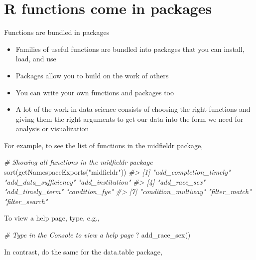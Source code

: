 \documentclass[
]{book}
\newenvironment{Shaded}{\begin{snugshade}}{\end{snugshade}}
\newcommand{\CommentTok}[1]{\textcolor[rgb]{0.56,0.35,0.01}{\textit{#1}}}
\newcommand{\FunctionTok}[1]{\textcolor[rgb]{0.00,0.00,0.00}{#1}}
\newcommand{\NormalTok}[1]{#1}
\newcommand{\StringTok}[1]{\textcolor[rgb]{0.31,0.60,0.02}{#1}}
\providecommand{\tightlist}{%
  \setlength{\itemsep}{0pt}\setlength{\parskip}{0pt}}
\begin{document}
\hypertarget{r-functions-come-in-packages}{%
\section{R functions come in packages}\label{r-functions-come-in-packages}}

Functions are bundled in packages

\begin{itemize}
\tightlist
\item
  Families of useful functions are bundled into packages that you can install, load, and use
\item
  Packages allow you to build on the work of others
\item
  You can write your own functions and packages too
\item
  A lot of the work in data science consists of choosing the right functions and giving them the right arguments to get our data into the form we need for analysis or visualization
\end{itemize}

For example, to see the list of functions in the midfieldr package,

\begin{Shaded}
\begin{Highlighting}[]
\CommentTok{\# Showing all functions in the midfieldr package }
\FunctionTok{sort}\NormalTok{(}\FunctionTok{getNamespaceExports}\NormalTok{(}\StringTok{"midfieldr"}\NormalTok{))}
\CommentTok{\#\textgreater{} [1] "add\_completion\_timely" "add\_data\_sufficiency"  "add\_institution"      }
\CommentTok{\#\textgreater{} [4] "add\_race\_sex"          "add\_timely\_term"       "condition\_fye"        }
\CommentTok{\#\textgreater{} [7] "condition\_multiway"    "filter\_match"          "filter\_search"}
\end{Highlighting}
\end{Shaded}

To view a help page, type, e.g.,

\begin{Shaded}
\begin{Highlighting}[]
\CommentTok{\# Type in the Console to view a help page }
\NormalTok{? }\FunctionTok{add\_race\_sex}\NormalTok{() }
\end{Highlighting}
\end{Shaded}

In contrast, do the same for the data.table package,
\end{document}
